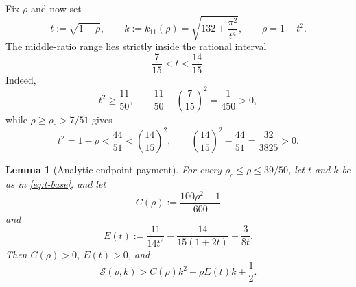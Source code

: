 \documentclass[11pt]{article}
\newtheorem{lemma}[theorem]{Lemma}
\theoremstyle{remark}
\begin{document}
Fix \(\rho\) and now set
\begin{equation}
 t:=\sqrt{1-\rho},
 \qquad
 k:=k_{11}(\rho)
 =\sqrt{132+\frac{\pi^2}{t^4}},
 \qquad
 \rho=1-t^2.
 \label{eq:t-base}
\end{equation}
The middle-ratio range lies strictly inside the rational interval
\begin{equation}
 \frac7{15}<t<\frac{14}{15}.
 \label{eq:t-interval}
\end{equation}
Indeed,
\[
 t^2\geq\frac{11}{50},
 \qquad
 \frac{11}{50}-\left(\frac7{15}\right)^2
 =\frac1{450}>0,
\]
while \(\rho\geq\rho_c>7/51\) gives
\[
 t^2=1-\rho<\frac{44}{51}
 <\left(\frac{14}{15}\right)^2,
 \qquad
 \left(\frac{14}{15}\right)^2-\frac{44}{51}
 =\frac{32}{3825}>0.
\]

\begin{lemma}[Analytic endpoint payment]
\label{lem:endpoint-payment}
For every \(\rho_c\leq\rho\leq39/50\), let \(t\) and \(k\) be as in
\eqref{eq:t-base}, and let
\begin{equation}
 C(\rho):=\frac{100\rho^2-1}{600}
 \label{eq:C}
\end{equation}
and
\begin{equation}
 E(t):=
 \frac{11}{14t^2}
 -\frac{14}{15(1+2t)}
 -\frac{3}{8t}.
 \label{eq:E}
\end{equation}
Then \(C(\rho)>0\), \(E(t)>0\), and
\begin{equation}
 \mathcal S(\rho,k)>
 C(\rho)k^2-\rho E(t)k+\frac12.
 \label{eq:S-base-lower}
\end{equation}
\end{lemma}
\end{document}
